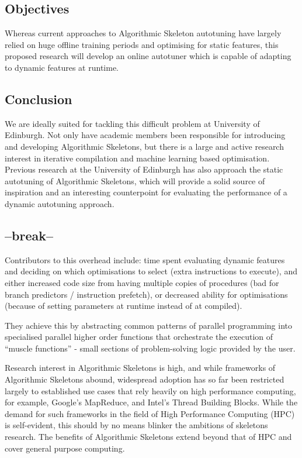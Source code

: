 \subsection{Objectives}
Whereas current approaches to Algorithmic Skeleton autotuning have
largely relied on huge offline training periods and optimising for
static features, this proposed research will develop an online
autotuner which is capable of adapting to dynamic features at runtime.

\subsection{Conclusion}

We are ideally suited for tackling this difficult problem at
University of Edinburgh. Not only have academic members been
responsible for introducing and developing Algorithmic Skeletons, but
there is a large and active research interest in iterative compilation
and machine learning based optimisation. Previous research at the
University of Edinburgh has also approach the static autotuning of
Algorithmic Skeletons, which will provide a solid source of
inspiration and an interesting counterpoint for evaluating the
performance of a dynamic autotuning approach.

\subsection*{--break--}

Contributors to this overhead include: time spent evaluating dynamic
features and deciding on which optimisations to select (extra
instructions to execute), and either increased code size from having
multiple copies of procedures (bad for branch predictors / instruction
prefetch), or decreased ability for optimisations (because of setting
parameters at runtime instead of at compiled).

They achieve this by abstracting common patterns of parallel
programming into specialised parallel higher order functions that
orchestrate the execution of ``muscle functions'' - small sections of
problem-solving logic provided by the user.

Research interest in Algorithmic Skeletons is high, and while
frameworks of Algorithmic Skeletons abound, widespread adoption has so
far been restricted largely to established use cases that rely heavily
on high performance computing, for example, Google's MapReduce, and
Intel's Thread Building Blocks. While the demand for such frameworks
in the field of High Performance Computing (HPC) is self-evident, this
should by no means blinker the ambitions of skeletons research. The
benefits of Algorithmic Skeletons extend beyond that of HPC and cover
general purpose computing.

